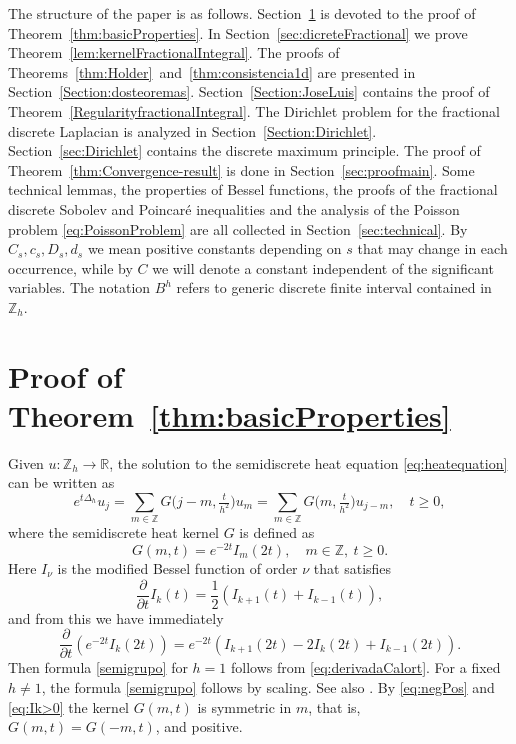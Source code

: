 \documentclass[a4paper,11pt,reqno]{amsart}
\newcommand{\R}{\mathbb{R}}
\newcommand{\Z}{\mathbb{Z}}
\theoremstyle{definition}
\numberwithin{equation}{section}
\begin{document}
The structure of the paper is as follows.
Section~\ref{sec:proofBasic} is devoted to the proof of Theorem~\ref{thm:basicProperties}.
In Section~\ref{sec:dicreteFractional} we prove Theorem~\ref{lem:kernelFractionalIntegral}.
The proofs of Theorems~\ref{thm:Holder}~and~\ref{thm:consistencia1d} are
presented in Section~\ref{Section:dosteoremas}.
Section~\ref{Section:JoseLuis} contains the proof of Theorem~\ref{RegularityfractionalIntegral}.
The Dirichlet problem for the fractional discrete Laplacian is analyzed
in Section~\ref{Section:Dirichlet}. Section~\ref{sec:Dirichlet} contains the discrete maximum principle.
The proof of Theorem~\ref{thm:Convergence-result} is done in Section~\ref{sec:proofmain}.
Some technical lemmas, the properties of Bessel functions,
the proofs of the fractional discrete Sobolev and Poincar\'e inequalities
and the analysis of the Poisson problem \eqref{eq:PoissonProblem} are
all collected in Section~\ref{sec:technical}.
By $C_s,c_s,D_s,d_s$ we mean positive constants depending on $s$ that may change in each occurrence, while
by $C$ we will denote a constant independent of the significant variables.
The notation $B^h$ refers to generic discrete finite interval contained in~$\Z_h$.

\section{Proof of Theorem~\ref{thm:basicProperties}}
\label{sec:proofBasic}

Given $u:\Z_h\to\R$, the solution to the semidiscrete heat equation \eqref{eq:heatequation} can be written as
\begin{equation}
\label{semigrupo}
e^{t\Delta_h}u_{j} = \sum_{m\in \Z}G\big(j-m,\tfrac{t}{h^2}\big)u_{m}=
\sum_{m\in \Z}G\big(m,\tfrac{t}{h^2}\big)u_{j-m}, \quad t\geq0,
\end{equation}
where the semidiscrete heat kernel $G$ is defined as
\begin{equation}
\label{eq:semidiscreteheatkernel}
G(m,t) = e^{-2t} I_{m}(2t),\quad m\in \Z,~t\geq0.
\end{equation}
Here $I_\nu$ is the modified Bessel function of order $\nu$ that satisfies 
\[
  \frac{\partial}{\partial t} I_k(t) = \frac{1}{2} (I_{k+1}(t) + I_{k-1}(t)),
\]
and from this we have  immediately
\begin{equation}
\label{eq:derivadaCalort}
  \frac{\partial}{\partial t} (e^{-2t} I_k(2t)) = e^{-2t} (I_{k+1}(2t) - 2I_{k}(2t) + I_{k-1}(2t)).
\end{equation}
Then formula \eqref{semigrupo} for $h=1$ follows from \eqref{eq:derivadaCalort}.
For a fixed $h\neq 1$, the formula \eqref{semigrupo} follows  by scaling. See also \cite{FiveGuys,GrIl}.
By \eqref{eq:negPos} and \eqref{eq:Ik>0} the kernel $G(m,t)$ is
symmetric in $m$, that is, $G(m,t)=G(-m,t)$, and positive.
\end{document}
